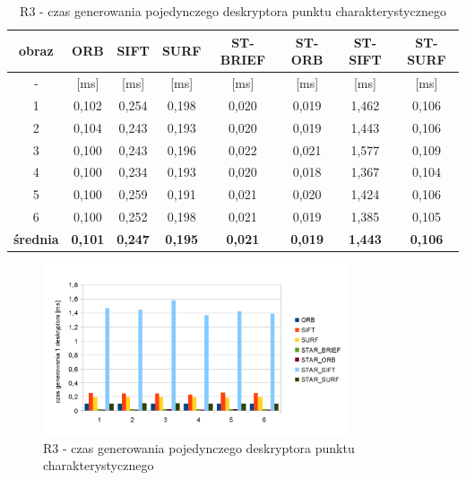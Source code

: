 \begin{table}[htbp]
  \centering
  \caption{R3 - czas generowania pojedynczego deskryptora punktu charakterystycznego}
    \begin{tabular}{|c|c|c|c|c|c|c|c|}\hline

    obraz & \textbf{ORB} & \textbf{SIFT} & \textbf{SURF} & \textbf{ST-BRIEF} & \textbf{ST-ORB} & \textbf{ST-SIFT} & \textbf{ST-SURF} \\\hline

    - & [ms] & [ms] & [ms] & [ms] & [ms] & [ms] & [ms] \\\hline
    1 & 0,102 & 0,254 & 0,198 & 0,020 & 0,019 & 1,462 & 0,106 \\
    2 & 0,104 & 0,243 & 0,193 & 0,020 & 0,019 & 1,443 & 0,106 \\
    3 & 0,100 & 0,243 & 0,196 & 0,022 & 0,021 & 1,577 & 0,109 \\
    4 & 0,100 & 0,234 & 0,193 & 0,020 & 0,018 & 1,367 & 0,104 \\
    5 & 0,100 & 0,259 & 0,191 & 0,021 & 0,020 & 1,424 & 0,106 \\
    6 & 0,100 & 0,252 & 0,198 & 0,021 & 0,019 & 1,385 & 0,105 \\\hline
    \textbf{średnia} & \textbf{0,101} & \textbf{0,247} & \textbf{0,195} & \textbf{0,021} & \textbf{0,019} & \textbf{1,443} & \textbf{0,106} \\\hline
    
    \end{tabular}%
  \label{tab:r3_f3}%
\end{table}%


\begin{figure}
\centering
\includegraphics[width=0.8\textwidth]{pict/slowik/r3/f3.png}
\caption{R3 - czas generowania pojedynczego deskryptora punktu charakterystycznego}
\label{fig:r3_f3}
\end{figure}


